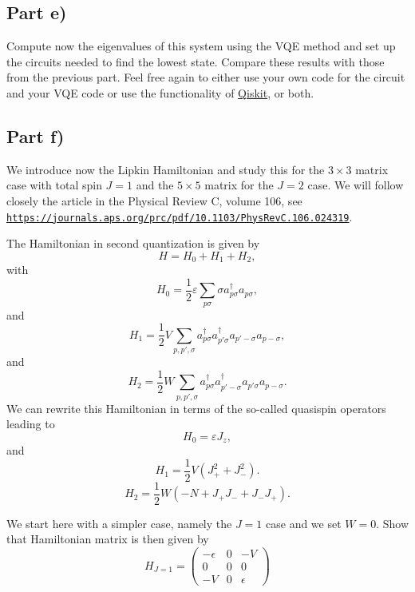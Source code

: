\documentclass[%
oneside,                 %
final,                   %
10pt]{article}
\begin{document}
\subsection{Part e)}

Compute now the eigenvalues of this system using the VQE method and
set up the circuits needed to find the lowest state. Compare these
results with those from the previous part. Feel free again to either
use your own code for the circuit and your VQE code or use the
functionality of \href{{https://qiskit.org/}}{Qiskit}, or both.

\subsection{Part f)}

We introduce now the Lipkin Hamiltonian and study this for the
$3\times 3$ matrix case with total spin $J=1$ and the $5\times 5$
matrix for the $J=2$ case.
We will follow closely the article in the Physical Review C, volume 106, see \href{{https://journals.aps.org/prc/pdf/10.1103/PhysRevC.106.024319}}{\nolinkurl{https://journals.aps.org/prc/pdf/10.1103/PhysRevC.106.024319}}.

The Hamiltonian in second quantization is given by
\[
H = H_0 + H_1 +H_2,
\]
with 
\[
H_0 = \frac{1}{2} \varepsilon \sum_{p\sigma}\sigma a_{p\sigma}^{\dagger}a_{p\sigma},
\]
and
\[
H_1 = \frac{1}{2} V \sum_{p,p',\sigma} a_{p\sigma}^\dagger a_{p'\sigma}^\dagger a_{p'-\sigma} a_{p-\sigma},
\]
and
\[
H_{2} = \frac{1}{2} W \sum_{p,p',\sigma}a_{p\sigma}^\dagger a_{p'-\sigma}^\dagger a_{p'\sigma}a_{p-\sigma}.
\]
We can rewrite this Hamiltonian in terms of the so-called quasispin operators leading to
\begin{equation}
H_0 = \varepsilon J_z,
\end{equation}
and
\begin{equation}
H_1 = \frac{1}{2} V \left( J_+^2 + J_-^2 \right).
\end{equation}
\begin{equation}
H_2 = \frac{1}{2} W \left( -N + J_+ J_- + J_- J_+ \right).
\end{equation}

We start here with a simpler case, namely the $J=1$ case and we set $W=0$. Show that Hamiltonian matrix is then given by
\begin{equation}
H_{J = 1} =
\begin{pmatrix}-\epsilon & 0 & -V\\
 0&0&0\\
 -V&0&\epsilon
\end{pmatrix}
\end{equation}
\end{document}
